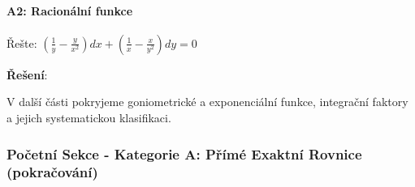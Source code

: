 \vspace{0.8\baselineskip}

\paragraph*{A2: Racionální funkce}

\begin{example}
Řešte: $\left(\frac{1}{y} - \frac{y}{x^2}\right)dx + \left(\frac{1}{x} - \frac{x}{y^2}\right)dy = 0$
\vspace{0.3\baselineskip}

\textbf{Řešení}: 
\end{example}

\vspace{0.8\baselineskip}

\begin{transition}
V další části pokryjeme goniometrické a exponenciální funkce, integrační faktory a jejich systematickou klasifikaci.
\end{transition}

\subsubsection{Početní Sekce - Kategorie A: Přímé Exaktní Rovnice (pokračování)}
\label{subsubsec:pocetni-kategorie-a-pokracovani}

